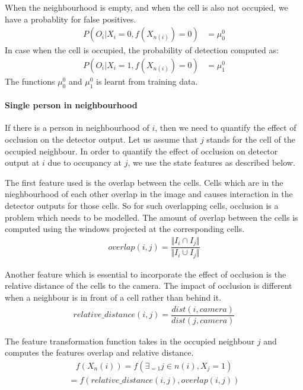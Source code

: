 \documentclass[10pt,twocolumn,letterpaper]{article}
\begin{document}
When the neighbourhood is empty, and when the cell is also not occupied, we have a probablity for false positives.
\begin{align}
 P(O_{i} |X_{i}=0 ,f(X_{n(i)}) =0)  &=\mu^{0}_{0}
\end{align}
In case when the cell is occupied, the probability of detection computed as:
\begin{align}
 P(O_{i} |X_{i}=1 ,f(X_{n(i)}) =0)  &=\mu^{0}_{1}
\end{align}
The functions $ \mu^{0}_{0} $  and $ \mu^{0}_{1} $ is learnt from training data.
\paragraph{Single person in neighbourhood}
If there is a person in neighbourhood of $i$, then we need to quantify the effect of occlusion on the detector output. Let us assume that $j$ stands for the cell of the occupied neighbour.  In order to quantify the effect of occlusion on detector output at $i$ due to  occupancy at $j$, we use the state features as described below.

The first feature used is the overlap between the cells. Cells which are in the nieghbourhood of each other overlap in the image and causes interaction in the detector outputs for those cells. So for such overlapping cells, occlusion is a problem which needs to be modelled. The amount of overlap between the cells is computed using the windows projected at the corresponding cells. 
\begin{align}
overlap(i,j) = \dfrac{\Vert I_{i} \cap I_{j} \Vert}{\Vert I_{i} \cup I_{j} \Vert}
\end{align}

Another feature which is essential to incorporate the effect of occlusion is the relative distance of the cells to the camera. 
The impact of occlusion is different when a neighbour is in front of a cell rather than behind it. 
\begin{align}
relative\_ distance(i,j) = \dfrac{dist(i,camera)}{dist(j,camera)}
\end{align}

The feature transformation function takes in the occupied neighbour $j$ and computes the features overlap and relative distance.
\begin{align}
f(X_n(i)) = f(\exists_{=1} j \in{n(i)},X_{j} =1)
\end{align}
\begin{align}
= f(relative\_ distance(i,j),overlap(i,j))
\end{align}
\end{document}
